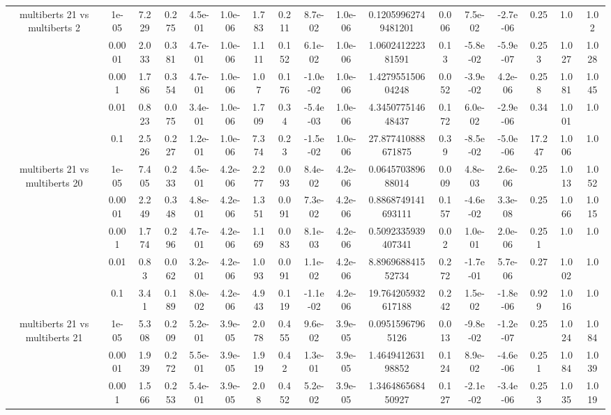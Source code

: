 \begin{tabular}{|c|c|c|c|c|c|c|c|c|c|c|c|c|c|c|c|c|}
\hline
\multirow{5}{*}{multiberts 21 vs multiberts 2} & 1e-05 & 7.229 & 0.275 & 4.5e-01 & 1.0e-06 & 1.783 & 0.211 & 8.7e-02 & 1.0e-06 & 0.12059962749481201 & 0.006 & 7.5e-02 & -2.7e-06 & 0.25 & 1.0 & 1.02 \\
 & 0.0001 & 2.033 & 0.381 & 4.7e-01 & 1.0e-06 & 1.111 & 0.152 & 6.1e-02 & 1.0e-06 & 1.060241222381591 & 0.13 & -5.8e-02 & -5.9e-07 & 0.253 & 1.027 & 1.028 \\
 & 0.001 & 1.786 & 0.354 & 4.7e-01 & 1.0e-06 & 1.07 & 0.176 & -1.0e-02 & 1.0e-06 & 1.427955150604248 & 0.052 & -3.9e-02 & 4.2e-06 & 0.258 & 1.081 & 1.045 \\
 & 0.01 & 0.823 & 0.075 & 3.4e-01 & 1.0e-06 & 1.709 & 0.34 & -5.4e-03 & 1.0e-06 & 4.345077514648437 & 0.172 & 6.0e-02 & -2.9e-06 & 0.34 & 1.001 & 1.0 \\
 & 0.1 & 2.526 & 0.227 & 1.2e-01 & 1.0e-06 & 7.374 & 0.23 & -1.5e-02 & 1.0e-06 & 27.877410888671875 & 0.39 & -8.5e-02 & -5.0e-06 & 17.247 & 1.006 & 1.0 \\
\hline
\multirow{5}{*}{multiberts 21 vs multiberts 20} & 1e-05 & 7.405 & 0.233 & 4.5e-01 & 4.2e-06 & 2.277 & 0.093 & 8.4e-02 & 4.2e-06 & 0.064570389688014 & 0.009 & 4.8e-03 & 2.6e-06 & 0.25 & 1.013 & 1.052 \\
 & 0.0001 & 2.249 & 0.348 & 4.8e-01 & 4.2e-06 & 1.351 & 0.091 & 7.3e-02 & 4.2e-06 & 0.8868749141693111 & 0.157 & -4.6e-02 & 3.3e-08 & 0.25 & 1.066 & 1.015 \\
 & 0.001 & 1.774 & 0.296 & 4.7e-01 & 4.2e-06 & 1.169 & 0.083 & 8.1e-03 & 4.2e-06 & 0.5092335939407341 & 0.02 & 1.0e-01 & 2.0e-06 & 0.251 & 1.0 & 1.0 \\
 & 0.01 & 0.83 & 0.062 & 3.2e-01 & 4.2e-06 & 1.093 & 0.091 & 1.1e-02 & 4.2e-06 & 8.896968841552734 & 0.272 & -1.7e-01 & 5.7e-06 & 0.27 & 1.002 & 1.0 \\
 & 0.1 & 3.41 & 0.189 & 8.0e-02 & 4.2e-06 & 4.943 & 0.119 & -1.1e-02 & 4.2e-06 & 19.764205932617188 & 0.242 & 1.5e-02 & -1.8e-06 & 0.929 & 1.016 & 1.0 \\
\hline
\multirow{5}{*}{multiberts 21 vs multiberts 21} & 1e-05 & 5.308 & 0.209 & 5.2e-01 & 3.9e-05 & 2.078 & 0.455 & 9.6e-02 & 3.9e-05 & 0.09515967965126 & 0.013 & -9.8e-02 & -1.2e-07 & 0.25 & 1.024 & 1.084 \\
 & 0.0001 & 1.939 & 0.272 & 5.5e-01 & 3.9e-05 & 1.919 & 0.42 & 1.3e-01 & 3.9e-05 & 1.464941263198852 & 0.124 & 8.9e-02 & -4.6e-06 & 0.251 & 1.084 & 1.039 \\
 & 0.001 & 1.566 & 0.253 & 5.4e-01 & 3.9e-05 & 2.08 & 0.452 & 5.2e-02 & 3.9e-05 & 1.346486568450927 & 0.127 & -2.1e-02 & -3.4e-06 & 0.253 & 1.035 & 1.019 \\

\end{tabular}
